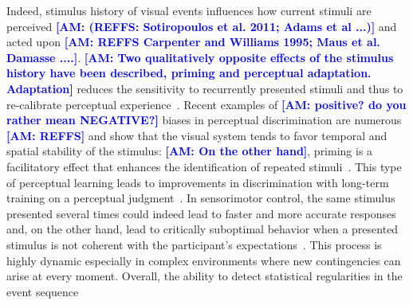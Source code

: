 \documentclass[12pt,english]{article}%
\newcommand{\citep}[1]{\parencite{#1}}
\newcommand{\AM}[1]{\textbf{\textcolor{blue}{[AM: #1]}}}
\begin{document}
Indeed, stimulus history of visual events influences
how current stimuli are perceived \AM{(REFFS: Sotiropoulos et al. 2011; Adams et al ...)} and acted upon \AM{REFFS Carpenter and Williams 1995; Maus et al. Damasse ....}.
\AM{Two qualitatively opposite effects of the stimulus history have been described, priming and perceptual adaptation. Adaptation} reduces
the sensitivity to recurrently presented stimuli and
thus to re-calibrate perceptual experience~\citep{Clifford2007, Webster2011, Kohn2007}.
Recent examples of \AM{positive? do you rather mean NEGATIVE?} biases in perceptual discrimination are
numerous \AM{REFFS} and show that the visual system tends
to favor temporal and spatial stability of the stimulus:
\AM{On the other hand}, priming is a facilitatory effect that
enhances the identification of repeated stimuli~\citep{Verstraten1994, Tiest2009}.
This type of perceptual learning leads to improvements in discrimination
with long-term training on a perceptual judgment~\citep{Lu2009}.
In sensorimotor control, the same stimulus presented several times could indeed
lead to faster and more accurate responses and,
on the other hand, lead to critically suboptimal behavior
when a presented stimulus is not coherent
with the participant's expectations~\citep{Hyman1953, Yu2009}.
This process is highly dynamic especially in complex environments
where new contingencies can arise at every moment.
Overall, the ability to detect statistical regularities in the event sequence
\end{document}
